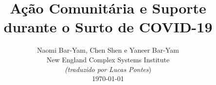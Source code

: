 \documentclass[onecolumn,journal]{IEEEtran}
\begin{document}
\title{\color{Brown}  Ação Comunitária e Suporte \\ durante o Surto de COVID-19
\vspace{-0.35ex}}
\author{Naomi Bar-Yam, Chen Shen e Yaneer Bar-Yam \\ New England Complex Systems Institute \\
\vspace{+0.35ex}
\small{\textit{(traduzido por Lucas Pontes})}\\
 \today
  \vspace{-8ex} \\
\textbf{}
 }

\maketitle




\thispagestyle{empty} %




\end{document}
